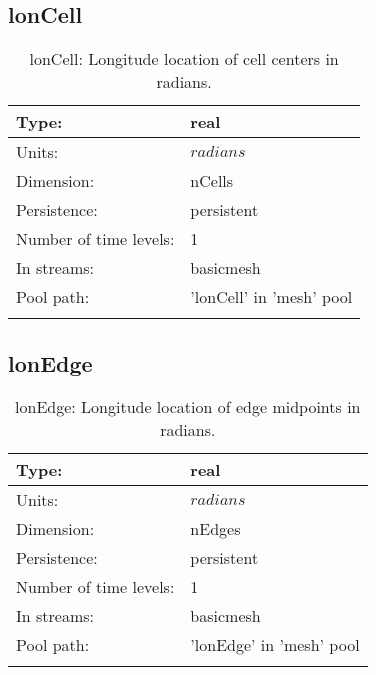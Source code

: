 \subsection[lonCell]{lonCell}
\label{subsec:var_sec_mesh_lonCell}
\begin{center}
\begin{longtable}{| p{2.0in} | p{4.0in} |}
        \hline 
        Type: & real \\
        \hline 
        Units: & $radians$ \\
        \hline 
        Dimension: & nCells \\
        \hline 
        Persistence: & persistent \\
        \hline 
        Number of time levels: & 1 \\
        \hline 
		 In streams: &  basicmesh \\
        \hline 
            Pool path: & 'lonCell' in 'mesh' pool
 \\
		 \hline 
    \caption{lonCell: Longitude location of cell centers in radians.}
\end{longtable}
\end{center}
\subsection[lonEdge]{lonEdge}
\label{subsec:var_sec_mesh_lonEdge}
\begin{center}
\begin{longtable}{| p{2.0in} | p{4.0in} |}
        \hline 
        Type: & real \\
        \hline 
        Units: & $radians$ \\
        \hline 
        Dimension: & nEdges \\
        \hline 
        Persistence: & persistent \\
        \hline 
        Number of time levels: & 1 \\
        \hline 
		 In streams: &  basicmesh \\
        \hline 
            Pool path: & 'lonEdge' in 'mesh' pool
 \\
		 \hline 
    \caption{lonEdge: Longitude location of edge midpoints in radians.}
\end{longtable}
\end{center}
